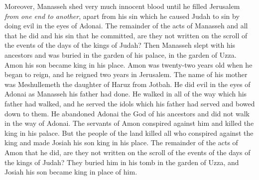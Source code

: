 \begin{biblechapter}
\verse Moreover, Manasseh shed very much innocent blood until he filled Jerusalem \textit{from one end to another}, apart from his sin which he caused Judah to sin by doing evil in the eyes of Adonai.
\verse The remainder of the acts of Manasseh and all that he did and his sin that he committed, are they not written on the scroll of the events of the days of the kings of Judah?
\verse Then Manasseh slept with his ancestors and was buried in the garden of his palace, in the garden of Uzza. Amon his son became king in his place.
 Amon was twenty-two years old when he began to reign, and he reigned two years in Jerusalem. The name of his mother was Meshullemeth the daughter of Haruz from Jotbah.
\verse He did evil in the eyes of Adonai as Manasseh his father had done.
\verse He walked in all of the way which his father had walked, and he served the idols which his father had served and bowed down to them.
\verse He abandoned Adonai the God of his ancestors and did not walk in the way of Adonai.
\verse The servants of Amon conspired against him and killed the king in his palace.
\verse But the people of the land killed all who conspired against the king and made Josiah his son king in his place.
\verse The remainder of the acts of Amon that he did, are they not written on the scroll of the events of the days of the kings of Judah?
\verse They buried him in his tomb in the garden of Uzza, and Josiah his son became king in place of him.
\end{biblechapter}

